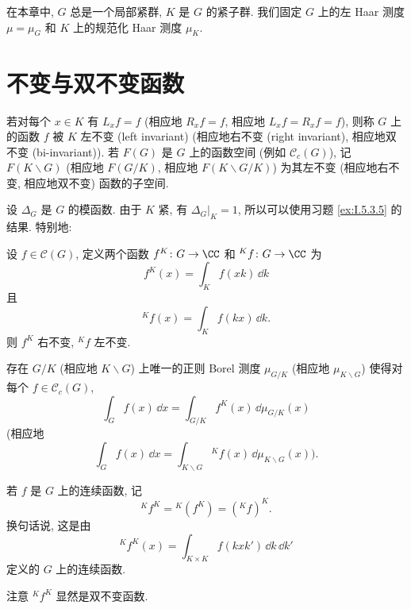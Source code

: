 
在本章中, $G$ 总是一个局部紧群, $K$ 是 $G$ 的紧子群. 我们固定 $G$ 上的左 Haar 测度 $\mu = \mu_G$ 和 $K$ 上的规范化 Haar 测度 $\mu_K$.

\section{不变与双不变函数}

\begin{definition}[左/右/双不变函数]
\label{def:V.1.1}
若对每个 $x \in K$ 有 $L_xf = f$ (相应地 $R_xf = f$, 相应地 $L_xf = R_xf = f$), 则称 $G$ 上的函数 $f$ 被 $K$ 左不变 (left invariant) (相应地右不变 (right invariant), 相应地双不变 (bi-invariant)).
若 $F(G)$ 是 $G$ 上的函数空间 (例如 $\mathcal{C}_c(G)$), 记 $F(K\backslash G)$ (相应地 $F(G/K)$, 相应地 $F(K\backslash G/K)$) 为其左不变 (相应地右不变, 相应地双不变) 函数的子空间.
\end{definition}

设 $\Delta_G$ 是 $G$ 的模函数. 由于 $K$ 紧, 有 $\Delta_G|_K = 1$, 所以可以使用习题 \ref{ex:I.5.3.5} 的结果. 特别地:

\begin{proposition}[平均化算子]
\label{prop:V.1.2}
设 $f \in \mathcal{C}(G)$, 定义两个函数 $f^K \colon G \to \CC$ 和 ${}^Kf \colon G \to \CC$ 为
\[
f^K(x) = \int_K f(xk)\,\dd k
\]
且
\[
{}^Kf(x) = \int_K f(kx)\,\dd k.
\]
则 $f^K$ 右不变, ${}^Kf$ 左不变.
\end{proposition}

\begin{proposition}[商测度的存在性]
\label{prop:V.1.3}
存在 $G/K$ (相应地 $K\backslash G$) 上唯一的正则 Borel 测度 $\mu_{G/K}$ (相应地 $\mu_{K\backslash G}$) 使得对每个 $f \in \mathcal{C}_c(G)$,
\[
\int_G f(x)\,\dd x = \int_{G/K}f^K(x)\,\dd\mu_{G/K}(x)
\]
(相应地
\[
\int_G f(x)\,\dd x = \int_{K\backslash G}{}^Kf(x)\,\dd\mu_{K\backslash G}(x)).
\]
\end{proposition}

\begin{definition}[双平均化]
\label{def:V.1.4}
若 $f$ 是 $G$ 上的连续函数, 记
\[
{}^Kf^K = {}^K(f^K) = ({}^Kf)^K.
\]
换句话说, 这是由
\[
{}^Kf^K(x) = \int_{K \times K}f(kxk')\,\dd k\,\dd k'
\]
定义的 $G$ 上的连续函数.
\end{definition}

注意 ${}^Kf^K$ 显然是双不变函数.

